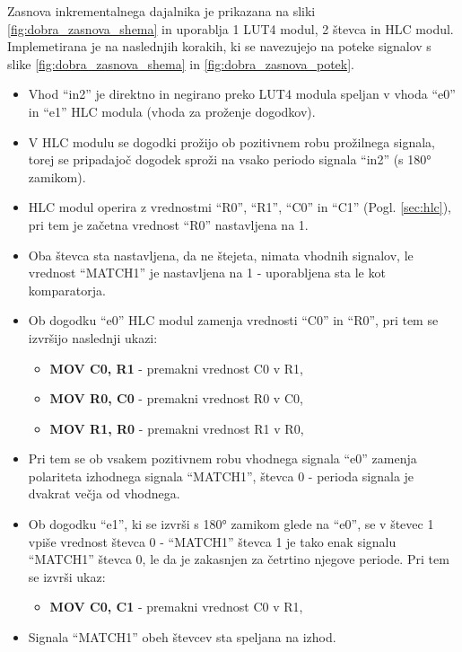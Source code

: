 \documentclass[a4paper]{article}
\begin{document}
Zasnova inkrementalnega dajalnika je prikazana na sliki \ref{fig:dobra_zasnova_shema} in uporablja 1 LUT4 modul, 2 števca in HLC modul. Implemetirana je na naslednjih korakih, ki se navezujejo na poteke signalov s slike \ref{fig:dobra_zasnova_shema} in \ref{fig:dobra_zasnova_potek}.
\begin{itemize}
    \item Vhod ``in2'' je direktno in negirano preko LUT4 modula speljan v vhoda ``e0'' in ``e1'' HLC modula (vhoda za proženje dogodkov).
    \item V HLC modulu se dogodki prožijo ob pozitivnem robu prožilnega signala, torej se pripadajoč dogodek sproži na vsako periodo signala ``in2'' (s 180° zamikom).
    \item HLC modul operira z vrednostmi ``R0'', ``R1'', ``C0'' in ``C1'' (Pogl. \ref{sec:hlc}), pri tem je začetna vrednost ``R0'' nastavljena na 1.
    \item Oba števca sta nastavljena, da ne štejeta, nimata vhodnih signalov, le vrednost ``MATCH1'' je nastavljena na 1 - uporabljena sta le kot komparatorja.
    \item Ob dogodku ``e0'' HLC modul zamenja vrednosti ``C0'' in ``R0'', pri tem se izvršijo naslednji ukazi:
    \begin{itemize}
        \item \textbf{MOV C0, R1} - premakni vrednost C0 v R1,
        \item \textbf{MOV R0, C0} - premakni vrednost R0 v C0,
        \item \textbf{MOV R1, R0} - premakni vrednost R1 v R0,
    \end{itemize}
    \item Pri tem se ob vsakem pozitivnem robu vhodnega signala ``e0'' zamenja polariteta izhodnega signala ``MATCH1'', števca 0 - perioda signala je dvakrat večja od vhodnega.
    \item Ob dogodku ``e1'', ki se izvrši s 180° zamikom glede na ``e0'', se v števec 1 vpiše vrednost števca 0 - ``MATCH1'' števca 1 je tako enak signalu ``MATCH1'' števca 0, le da je zakasnjen za četrtino njegove periode. Pri tem se izvrši ukaz:
    \begin{itemize}
        \item \textbf{MOV C0, C1} - premakni vrednost C0 v R1,
    \end{itemize}
    \item Signala ``MATCH1'' obeh števcev sta speljana na izhod.
\end{itemize}
\end{document}
